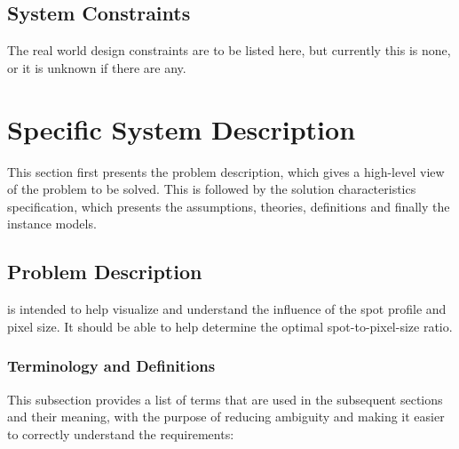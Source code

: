 \documentclass[12pt]{article}
\begin{document}
\subsection{System Constraints}

The real world design constraints are to be listed here, but currently this is none, or it is unknown if there are any.

\section{Specific System Description}

This section first presents the problem description, which gives a high-level
view of the problem to be solved.  This is followed by the solution characteristics
specification, which presents the assumptions, theories, definitions and finally
the instance models.

\subsection{Problem Description} \label{Sec_pd}

\progname{} is intended to help visualize and understand the influence of the 
spot profile and pixel size. It should be able to help determine the optimal 
spot-to-pixel-size ratio.

\subsubsection{Terminology and Definitions}

This subsection provides a list of terms that are used in the subsequent
sections and their meaning, with the purpose of reducing ambiguity and making it
easier to correctly understand the requirements:
\end{document}
